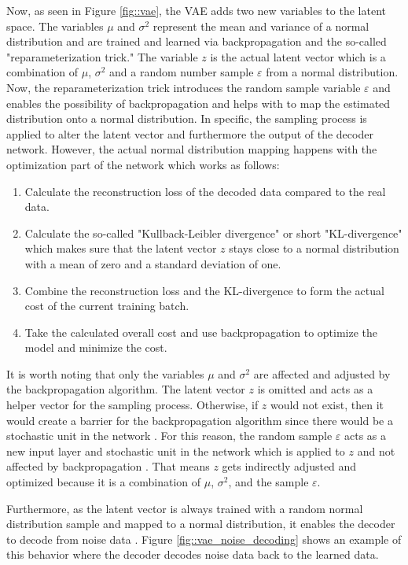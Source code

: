 \documentclass[MGS,Master,english]{twbook}%
\begin{document}
Now, as seen in Figure \ref{fig::vae}, the VAE adds two new variables to the latent space. The variables $\mu$ and $\sigma^{2}$ represent the mean and variance of a normal distribution and are trained and learned via backpropagation and the so-called "reparameterization trick." The variable $z$ is the actual latent vector which is a combination of $\mu$, $\sigma^{2}$ and a random number sample $\varepsilon$ from a normal distribution. Now, the reparameterization trick introduces the random sample variable $\varepsilon$ and enables the possibility of backpropagation and helps with to map the estimated distribution onto a normal distribution. In specific, the sampling process is applied to alter the latent vector and furthermore the output of the decoder network. However, the actual normal distribution mapping happens with the optimization part of the network which works as follows:
\begin{enumerate}
	\item Calculate the reconstruction loss of the decoded data compared to the real data.
	\item Calculate the so-called "Kullback-Leibler divergence" or short "KL-divergence" which makes sure that the latent vector $z$ stays close to a normal distribution with a mean of zero and a standard deviation of one.
	\item Combine the reconstruction loss and the KL-divergence to form the actual cost of the current training batch.
	\item Take the calculated overall cost and use backpropagation to optimize the model and minimize the cost.
\end{enumerate}

It is worth noting that only the variables $\mu$ and $\sigma^{2}$ are affected and adjusted by the backpropagation algorithm. The latent vector $z$ is omitted and acts as a helper vector for the sampling process. Otherwise, if $z$ would not exist, then it would create a barrier for the backpropagation algorithm since there would be a stochastic unit in the network \cite{ml::vae::tutorial}. For this reason, the random sample $\varepsilon$ acts as a new input layer and stochastic unit in the network which is applied to $z$ and not affected by backpropagation \cite{ml::vae::tutorial}. That means $z$ gets indirectly adjusted and optimized because it is a combination of $\mu$, $\sigma^{2}$, and the sample $\varepsilon$.

Furthermore, as the latent vector is always trained with a random normal distribution sample and mapped to a normal distribution, it enables the decoder to decode from noise data \cite{ml::vae::tutorial}. Figure \ref{fig::vae_noise_decoding} shows an example of this behavior where the decoder decodes noise data back to the learned data. 
\end{document}
